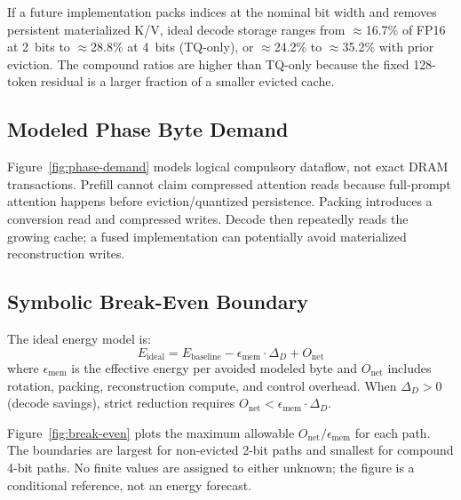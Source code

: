 \documentclass[sigconf,nonacm]{acmart}
\begin{document}
If a future implementation packs indices at the nominal bit width and removes
persistent materialized K/V, ideal decode storage ranges from $\approx$16.7\% of
FP16 at 2~bits to $\approx$28.8\% at 4~bits (TQ-only), or $\approx$24.2\% to
$\approx$35.2\% with prior eviction. The compound ratios are higher than
TQ-only because the fixed 128-token residual is a larger fraction of a smaller
evicted cache.

\subsection{Modeled Phase Byte Demand}

Figure~\ref{fig:phase-demand} models logical compulsory dataflow, not exact DRAM
transactions. Prefill cannot claim compressed attention reads because full-prompt
attention happens before eviction/quantized persistence. Packing introduces a
conversion read and compressed writes. Decode then repeatedly reads the growing
cache; a fused implementation can potentially avoid materialized reconstruction
writes.

\subsection{Symbolic Break-Even Boundary}

The ideal energy model is:
\begin{equation}
E_\text{ideal} = E_\text{baseline} - \epsilon_\text{mem} \cdot \Delta_D + O_\text{net}
\end{equation}
where $\epsilon_\text{mem}$ is the effective energy per avoided modeled byte and
$O_\text{net}$ includes rotation, packing, reconstruction compute, and control
overhead. When $\Delta_D > 0$ (decode savings), strict reduction requires
$O_\text{net} < \epsilon_\text{mem} \cdot \Delta_D$.

Figure~\ref{fig:break-even} plots the maximum allowable $O_\text{net}/\epsilon_\text{mem}$
for each path. The boundaries are largest for non-evicted 2-bit paths and smallest
for compound 4-bit paths. No finite values are assigned to either unknown; the
figure is a conditional reference, not an energy forecast.
\end{document}
